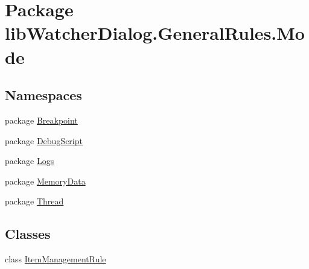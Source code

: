\hypertarget{namespacelib_watcher_dialog_1_1_general_rules_1_1_mode}{\section{Package lib\+Watcher\+Dialog.\+General\+Rules.\+Mode}
\label{namespacelib_watcher_dialog_1_1_general_rules_1_1_mode}
}
\subsection*{Namespaces}
\begin{DoxyCompactItemize}
\item 
package \hyperlink{namespacelib_watcher_dialog_1_1_general_rules_1_1_mode_1_1_breakpoint}{Breakpoint}
\item 
package \hyperlink{namespacelib_watcher_dialog_1_1_general_rules_1_1_mode_1_1_debug_script}{Debug\+Script}
\item 
package \hyperlink{namespacelib_watcher_dialog_1_1_general_rules_1_1_mode_1_1_logs}{Logs}
\item 
package \hyperlink{namespacelib_watcher_dialog_1_1_general_rules_1_1_mode_1_1_memory_data}{Memory\+Data}
\item 
package \hyperlink{namespacelib_watcher_dialog_1_1_general_rules_1_1_mode_1_1_thread}{Thread}
\end{DoxyCompactItemize}
\subsection*{Classes}
\begin{DoxyCompactItemize}
\item 
class \hyperlink{classlib_watcher_dialog_1_1_general_rules_1_1_mode_1_1_item_management_rule}{Item\+Management\+Rule}
\end{DoxyCompactItemize}
